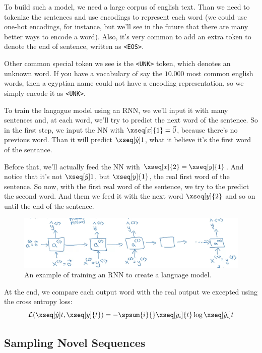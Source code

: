 \documentclass[12pt, a4paper, oneside]{book}
\begin{document}
To build such a model, we need a large corpus of english text. Than we need to
tokenize the sentences and use encodings to represent each word (we could use
one-hot encodings, for instance, but we'll see in the future that there are many
better ways to encode a word). Also, it's very common to add an extra token to
denote the end of sentence, written as \texttt{<EOS>}.

Other common special token we see is the \texttt{<UNK>} token, which denotes an
unknown word. If you have a vocabulary of say the $10.000$ most common english
words, then a egyptian name could not have a encoding representation, so we
simply encode it as \texttt{<UNK>}.

To train the langague model using an RNN, we we'll input it with many sentences
and, at each word, we'll try to predict the next word of the sentence. So in the
first step, we input the NN with $\xseq[x]{1}=\vec{0}$, because there's no
previous word. Than it will predict $\xseq[\hat{y}]{1}$, what it believe it's
the first word of the sentance.

Before that, we'll actually feed the NN with $\xseq[x]{2}=\xseq[y]{1}$. And
notice that it's not $\xseq[\hat{y}]{1}$, but $\xseq[y]{1}$, the real first word
of the sentence. So now, with the first real word of the sentence, we try to the
predict the second word. And them we feed it with the next word $\xseq[y]{2}$
and so on until the end of the sentence.

\begin{figure}[h]
\centering
\includegraphics[scale=0.4]{Res/RNN-language-model.jpg}
\caption{An example of training an RNN to create a language model.}
\label{RNN-language-model.jpg}
\end{figure}

At the end, we compare each output word with the real output we excepted using
the cross entropy loss:
\[
\mathcal{L}(\xseq[\hat{y}]{t}, \xseq[y]{t}) =
-\spsum{i}{}\xseq[y_i]{t}\log \xseq[\hat{y}_i]{t}
\]

\subsection{Sampling Novel Sequences}%
\label{sub:sampling_novel_sequences}
\end{document}
